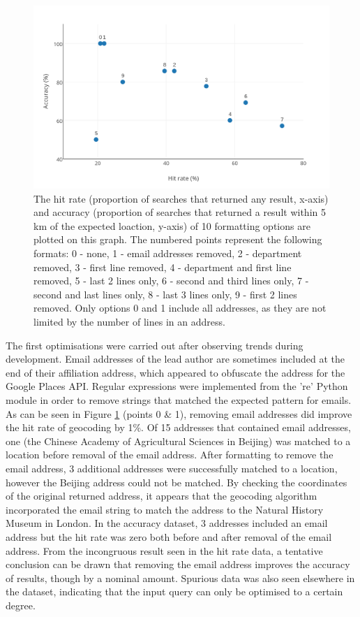 \documentclass[Report.tex]{subfiles}
\begin{document}
\begin{figure}[h!]
	\includegraphics[width=\textwidth]{../lib/images/geocode_performance_scatter}
	\caption{The hit rate (proportion of searches that returned any result, x-axis) and accuracy (proportion of searches that returned a result within 5 km of the expected loaction, y-axis) of 10 formatting options are plotted on this graph. The numbered points represent the following formats: 0 - none, 1 - email addresses removed, 2 - department removed, 3 - first line removed, 4 - department and first line removed, 5 - last 2 lines only, 6 - second and third lines only, 7 - second and last lines only, 8 - last 3 lines only, 9 - first 2 lines removed. Only options 0 and 1 include all addresses, as they are not limited by the number of lines in an address. \label{fig:geoscatter}}
\end{figure}

\noindent The first optimisations were carried out after observing trends during development. Email addresses of the lead author are sometimes included at the end of their affiliation address, which appeared to obfuscate the address for the Google Places API. Regular expressions were implemented from the 're' Python module in order to remove strings that matched the expected pattern for emails. As can be seen in Figure \ref{fig:geoscatter} (points 0 \& 1), removing email addresses did improve the hit rate of geocoding by 1\%. Of 15 addresses that contained email addresses, one (the Chinese Academy of Agricultural Sciences in Beijing) was matched to a location before removal of the email address. After formatting to remove the email address, 3 additional addresses were successfully matched to a location, however the Beijing address could not be matched. By checking the coordinates of the original returned address, it appears that the geocoding algorithm incorporated the email string to match the address to the Natural History Museum in London. In the accuracy dataset, 3 addresses included an email address but the hit rate was zero both before and after removal of the email address. From the incongruous result seen in the hit rate data, a tentative conclusion can be drawn that removing the email address improves the accuracy of results, though by a nominal amount. Spurious data was also seen elsewhere in the dataset, indicating that the input query can only be optimised to a certain degree.\newpage
\end{document}
